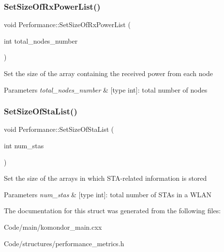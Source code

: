 \subsubsection{\texorpdfstring{Set\+Size\+Of\+Rx\+Power\+List()}{SetSizeOfRxPowerList()}}
{\footnotesize\ttfamily void Performance\+::\+Set\+Size\+Of\+Rx\+Power\+List (\begin{DoxyParamCaption}\item[{int}]{total\+\_\+nodes\+\_\+number }\end{DoxyParamCaption})\hspace{0.3cm}{\ttfamily [inline]}}

Set the size of the array containing the received power from each node 
\begin{DoxyParams}{Parameters}
{\em total\+\_\+nodes\+\_\+number} & \mbox{[}type int\mbox{]}\+: total number of nodes \\
\hline
\end{DoxyParams}
\mbox{\label{structPerformance_af6b92719f1a286afe9973304b8ecf445}} 
\subsubsection{\texorpdfstring{Set\+Size\+Of\+Sta\+List()}{SetSizeOfStaList()}}
{\footnotesize\ttfamily void Performance\+::\+Set\+Size\+Of\+Sta\+List (\begin{DoxyParamCaption}\item[{int}]{num\+\_\+stas }\end{DoxyParamCaption})\hspace{0.3cm}{\ttfamily [inline]}}

Set the size of the arrays in which S\+T\+A-\/related information is stored 
\begin{DoxyParams}{Parameters}
{\em num\+\_\+stas} & \mbox{[}type int\mbox{]}\+: total number of S\+T\+As in a W\+L\+AN \\
\hline
\end{DoxyParams}


The documentation for this struct was generated from the following files\+:\begin{DoxyCompactItemize}
\item 
Code/main/komondor\+\_\+main.\+cxx\item 
Code/structures/performance\+\_\+metrics.\+h\end{DoxyCompactItemize}
